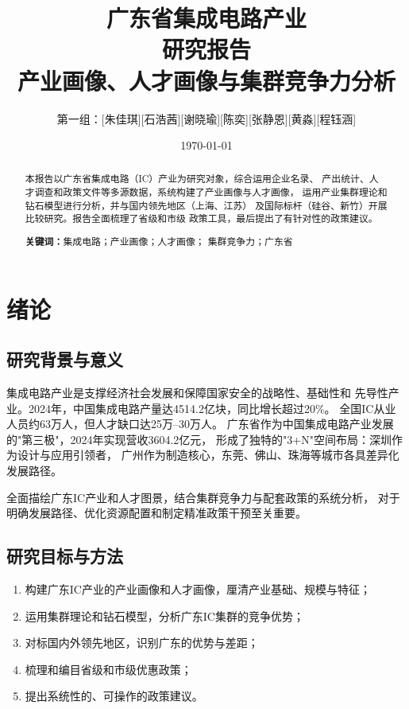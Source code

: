 \documentclass[12pt,a4paper]{article}
\title{{\Huge \textbf{广东省集成电路产业}}\\[4pt]
       {\Large \textbf{研究报告}}\\[8pt]
       {\large 产业画像、人才画像与集群竞争力分析}}
\author{第一组：[朱佳琪][石浩茜][谢晓瑜][陈奕][张静恩][黄淼][程钰涵]}
\date{\today}
\begin{document}
\maketitle
\thispagestyle{empty}

\begin{abstract}
\noindent
本报告以广东省集成电路（IC）产业为研究对象，综合运用企业名录、
产出统计、人才调查和政策文件等多源数据，系统构建了产业画像与人才画像，
运用产业集群理论和钻石模型进行分析，并与国内领先地区（上海、江苏）
及国际标杆（硅谷、新竹）开展比较研究。报告全面梳理了省级和市级
政策工具，最后提出了有针对性的政策建议。

\textbf{关键词：}集成电路；产业画像；人才画像；
集群竞争力；广东省
\end{abstract}

\newpage
\tableofcontents
\newpage
\listoffigures
\listoftables
\newpage

\section{绪论}
\label{sec:intro}

\subsection{研究背景与意义}
\label{sec:background}

集成电路产业是支撑经济社会发展和保障国家安全的战略性、基础性和
先导性产业。2024年，中国集成电路产量达4514.2亿块，同比增长超过20\%。
全国IC从业人员约63万人，但人才缺口达25万--30万人。
广东省作为中国集成电路产业发展的"第三极"，2024年实现营收3604.2亿元，
形成了独特的"3+N"空间布局：深圳作为设计与应用引领者，
广州作为制造核心，东莞、佛山、珠海等城市各具差异化发展路径。

全面描绘广东IC产业和人才图景，结合集群竞争力与配套政策的系统分析，
对于明确发展路径、优化资源配置和制定精准政策干预至关重要。

\subsection{研究目标与方法}
\label{sec:objectives}

\begin{enumerate}[label=(\arabic*)]
    \item 构建广东IC产业的产业画像和人才画像，厘清产业基础、规模与特征；
    \item 运用集群理论和钻石模型，分析广东IC集群的竞争优势；
    \item 对标国内外领先地区，识别广东的优势与差距；
    \item 梳理和编目省级和市级优惠政策；
    \item 提出系统性的、可操作的政策建议。
\end{enumerate}
\end{document}
